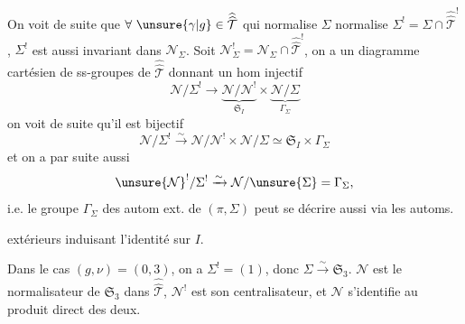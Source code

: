 On voit de suite que $\forall\ \unsure{\gamma|g}\in\widehat{\widehat{\mathcal T}}$ qui normalise $\Sigma$ normalise $\Sigma^!=\Sigma\cap\widehat{\widehat{\mathcal T}}^!$,  $\Sigma^!$ est aussi invariant dans $\mathcal N_\Sigma$.  Soit $\mathcal N_\Sigma^!=\mathcal N_\Sigma\cap\widehat{\widehat{\mathcal T}}^!$, on a un diagramme cartésien de ss-groupes de $\widehat{\widehat{\mathcal T}}$
donnant un hom injectif
\[
\mathcal N/\Sigma^!\longrightarrow
\underbrace{\mathcal N/\mathcal N^!}_{\mathfrak S_I}\times
\underbrace{\mathcal N/\Sigma}_{\Gamma_\Sigma}
\]
 on voit de suite qu'il est bijectif
\[
\mathcal N/\Sigma^!\xrightarrow{\sim}\mathcal N/\mathcal N^!\times\mathcal N/\Sigma\simeq\mathfrak S_I\times\Gamma_\Sigma
\]
et on a par suite aussi
\[
\unsure{\mathcal N}^!/\Sigma^!\xrightarrow{\sim}\mathcal N/\unsure{\Sigma}=\Gamma_\Sigma,
\]
i.e. le groupe $\Gamma_\Sigma$ des autom  ext. de $(\pi,\Sigma)$ peut se décrire aussi via les automs.

extérieurs induisant l'identité sur $I$.

Dans le cas $(g,\nu)=(0,3)$, on a $\Sigma^!=(1)$, \unsure{$\Rightarrow$} donc $\Sigma\xrightarrow{\sim}\mathfrak S_3$. $\mathcal N$ est le  normalisateur de $\mathfrak S_3$ dans $\widehat{\widehat{\mathcal T}}$, $\mathcal N^!$ \inserted{$\unsure{\xrightarrow{\sim}}\Gamma_\Sigma$} est son centralisateur, et $\mathcal N$ s'identifie au produit direct des deux.


